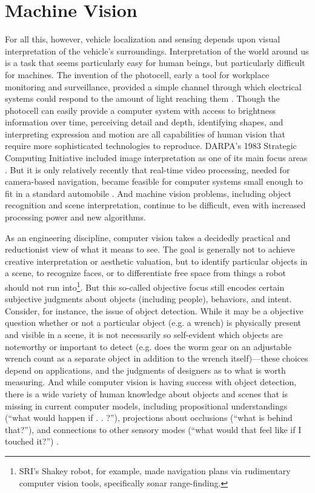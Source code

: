 \section{Machine Vision}
For all this, however, vehicle localization and sensing depends upon
visual interpretation of the vehicle's surroundings. Interpretation of
the world around us is a task that seems
particularly easy for human beings, but particularly difficult for
machines. The invention of the photocell, early a tool for workplace
monitoring and surveillance, provided a simple channel through which
electrical systems could respond to the amount of light reaching
them \cite[p. 44]{faxed} \cite[p. 361]{nyeElectrifying}. Though the photocell can easily
provide a computer system 
with access to brightness information over time, perceiving detail and
depth, identifying shapes, and interpreting expression and motion are
all capabilities of human vision that require more sophisticated
technologies to reproduce. DARPA's 1983 Strategic Computing Initiative
included image interpretation as one of its main
focus areas \cite[Afterword]{mccorduck}. But it is only relatively recently that real-time video
processing, needed for camera-based navigation, became feasible for computer
systems small enough to fit in a standard automobile \cite{vamors-p}. And machine
vision problems, including object recognition and scene
interpretation, continue to be difficult, even with increased
processing power and new algorithms. 

As an engineering discipline, computer vision takes a decidedly
practical and reductionist view of what it means to see. The goal is
generally not to achieve creative interpretation or aesthetic
valuation, but to identify particular objects in a scene, to recognize
faces, or to differentiate free space from things a robot should
not run into\footnote{SRI's Shakey robot, for example, made navigation
  plans via rudimentary computer vision tools, specifically sonar range-finding.}. But this so-called objective focus still encodes
certain subjective judgments about objects (including people),
behaviors, and intent. Consider, for instance, the issue of object
detection. While it may be a objective question whether or not a
particular object (e.g. a wrench) is physically present and visible in
a scene, it is not
necessarily so self-evident which objects are noteworthy or important
to detect (e.g. does the worm gear on an adjustable wrench count as a
separate object in addition
to the wrench itself)---these choices depend on applications, and the judgments of
designers as to what is worth measuring. And while computer vision is having success
with object detection, there is a wide variety of human knowledge
about objects and scenes that is missing in current computer
models, including propositional understandings (``what would happen if
. . ?''), projections about occlusions (``what is behind that?''), and
connections to other sensory modes (``what would that feel like if I
touched it?'') \cite{gomesJordan}.

